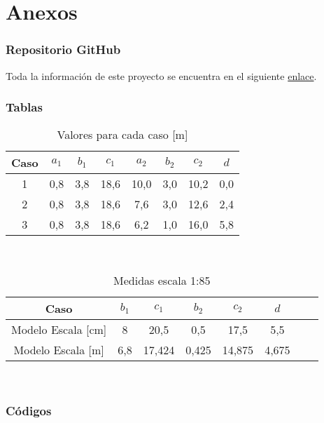 \part{Anexos}

\section{Repositorio GitHub}

Toda la información de este proyecto se encuentra en el siguiente \href{https://github.com/LukasWolff2002/ENTREGA_3_MCOC}{enlace}.

\section{Tablas}

\begin{table}[H]
    \centering
    \caption{Valores para cada caso [m]}
    \begin{tabular}{|c|c|c|c|c|c|c|c|}
    \hline
    Caso & $a_1$ & $b_1$ & $c_1$ & $a_2$ & $b_2$ & $c_2$ & $d$ \\ \hline
    1    & 0,8   & 3,8   & 18,6  & 10,0  & 3,0   & 10,2  & 0,0 \\ \hline
    2    & 0,8   & 3,8   & 18,6  & 7,6   & 3,0   & 12,6  & 2,4  \\ \hline
    3    & 0,8   & 3,8   & 18,6  & 6,2   & 1,0   & 16,0  & 5,8  \\ \hline
    \end{tabular}\\
    \label{tab:medidas}
\end{table}

\begin{table}[H]
    \centering
    \caption{Medidas escala 1:85}
    \begin{tabular}{|c|c|c|c|c|c|c|c|}
    \hline
    Caso  & $b_1$ & $c_1$  & $b_2$ & $c_2$ & $d$ \\ \hline
    Modelo Escala [cm] & 8  & 20,5  & 0,5   & 17,5  & 5,5 \\ \hline
    Modelo Escala [m] & 6,8  & 17,424 & 0,425   & 14,875  & 4,675  \\ \hline
    \end{tabular}\\
    \label{tab:medidas_escaladas}
\end{table}



\section{Códigos}

